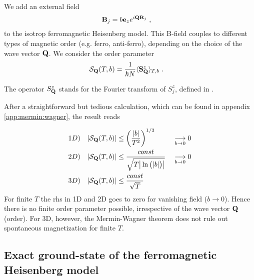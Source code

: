 We add an external field 
\begin{align*}
\mathbf B_{j} &= b \mathbf e_{z} e^{i \mathbf Q \mathbf R_{j}}\;,
\end{align*}
%
to the isotrop ferromagnetic Heisenberg model.
This B-field  couples to different types of magnetic order (e.g. ferro, anti-ferro), depending on the choice of the wave vector $\mathbf Q$. 
%
We consider the order parameter 
%
\begin{align}
{\cal S}_{\mathbf Q}(T,b) &= \frac{1}{\hbar N}\langle \mathbf S^{z}_{\mathbf Q}\rangle_{T,b}\;.
\end{align}

The operator $S^{z}_{\mathbf Q}$ stands for the Fourier transform of $S_{j}^{z}$, defined in .

After a straightforward but tedious calculation, which can be found in appendix \ref{app:mermin:wagner}, the result reads
%

\begin{subequations}\label{eq:}
\begin{align}
1D) &&\abs{{\cal S}_{\mathbf Q}(T,b)}&\le \bigg(\frac{  \abs{b}}{T^{2}}\bigg)^{1/3} &&\underset{b\to 0}{\longrightarrow} 0\\
2D) &&\abs{{\cal S}_{\mathbf Q}(T,b)}&\le 
\frac{const}{\sqrt{T
  \big|  \ln\big( \abs{b}  \big)\big| }}&&\underset{b\to 0}{\longrightarrow} 0\\
3D) &&  \abs{{\cal S}_{\mathbf Q}(T,b)} &\le \frac{const}{\sqrt{T}}
\end{align}
\end{subequations}
%
For finite $T$ the rhs in 1D and 2D goes to zero for vanishing field ($b\to 0$).
Hence there is no finite order parameter possible, irrespective of the wave vector $\mathbf Q$ (order). 
For 3D, however, the Mermin-Wagner theorem does not rule out spontaneous  magnetization for finite $T$.



 
 \subsection{Exact ground-state of the ferromagnetic Heisenberg model}

